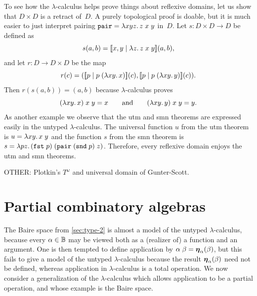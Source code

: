 To see how the $\lambda$-calculus helps prove things about reflexive
domains, let us show that $D \times D$ is a retract of~$D$. A purely
topological proof is doable, but it is much easier to just interpret
pairing $\mathtt{pair} = \lambda x y z .\,z\;x\;y$ in~$D$. Let $s : D
\times D \to D$ be defined as
%
\begin{equation*}
  s (a, b) = [\![x,y \mid \lambda z .\,z\;x\;y]\!](a,b),
\end{equation*}
%
and let $r : D \to D \times D$ be the map
%
\begin{equation*}
  r(c) = ([\![p \mid p\;(\lambda x y .\,x)]\!](c),
          [\![p \mid p\;(\lambda x y .\,y)]\!](c)).
\end{equation*}
%
Then $r (s (a, b)) = (a, b)$ because $\lambda$-calculus proves
%
\begin{equation*}
  (\lambda x y .\,x)\; x \; y = x
  \qquad\text{and}\qquad
  (\lambda x y .\,y)\; x \; y = y.
\end{equation*}
%
As another example we observe that the utm and smn theorems are
expressed easily in the untyped $\lambda$-calculus. The universal
function $u$ from the utm theorem is $u = \lambda x y .\,x\; y$ and the
function $s$ from the smn theorem is $s = \lambda p
  z .\,(\mathtt{fst}\;p)\;(\mathtt{pair}\;(\mathtt{snd}\; p)\;z)$.
Therefore, every reflexive domain enjoys the utm and smn theorems.


OTHER: Plotkin's $T^\omega$ and universal domain of Gunter-Scott.


\section{Partial combinatory algebras}
\label{sec:pcas}

The Baire space from \cref{sec:type-2} is almost a model of the
untyped $\lambda$-calculus, because every $\alpha \in \mathbb{B}$ may be
viewed both as a (realizer of) a function and an argument. One is then
tempted to define application by $\alpha \; \beta =
\text{\boldmath{$\eta$}}_{\alpha}(\beta)$, but this fails to give a model of the untyped
$\lambda$-calculus because the result $\text{\boldmath{$\eta$}}_{\alpha}(\beta)$ need not
be defined, whereas application in $\lambda$-calculus is a total
operation. We now consider a generalization of the $\lambda$-calculus
which allows application to be a partial operation, and whose example
is the Baire space.

